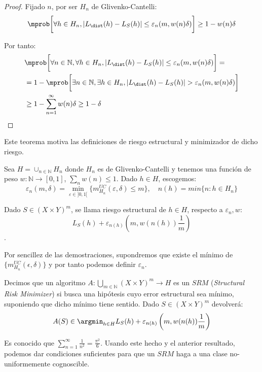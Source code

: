   \begin{proof}
   Fijado $n$, por ser $H_n$ de Glivenko-Cantelli:
   \[
     \mprob\bigg[\forall h\in H_n, |L_{\dist}(h) - L_S(h)| \le \varepsilon_n (m, w(n)\delta)\bigg] \ge 1- w(n) \delta
   \]

   Por tanto:
   \begin{align*}
   &\mprob \bigg[\forall n\in \mathbb{N}, \forall h\in H_n, |L_{\dist}(h) - L_S(h)| \le \varepsilon_n (m, w(n) \delta)\bigg] = \\
   &= 1 - \mprob\bigg[\exists n\in \mathbb{N}, \exists h\in H_n, |L_{\dist}(h) - L_S(h)| > \varepsilon_n (m, w(n) \delta)\bigg] \\
   &\ge 1- \sum_{n=1}^{\infty} w(n) \delta \ge 1-\delta
   \end{align*}
  \end{proof}

Este teorema motiva las definiciones de riesgo estructural y minimizador de dicho riesgo.

\begin{definition}
Sea $H = \cup_{n\in \mathbb{N}} H_n$ donde $H_n$ es de Glivenko-Cantelli y tenemos una función de peso
$w : \mathbb{N} \rightarrow [0,1]$, $\sum_n w(n) \le 1$. Dado $h\in H$, escogemos:
\[
  \varepsilon_n (m,\delta) = \min_{\varepsilon \in ]0,1[}\{m_{H_n}^{UC} (\varepsilon, \delta) \le m\}, \quad n(h) = min\{n: h\in H_n\}
\]

Dado $S\in (X\times Y)^m$, se llama riesgo estructural de $h\in H$, respecto a $\varepsilon_n, w$:
\[L_S(h) + \varepsilon_{n(h)} \left(m, w(n(h))\frac{1}{m}\right)\].
\end{definition}

Por sencillez de las demostraciones, supondremos que existe el mínimo de $\{m_{H_n}^{UC}(\epsilon, \delta)\}$ y por tanto
podemos definir $\varepsilon_n$.

\begin{definition}
Decimos que un algoritmo $A: \underset{m\in \mathbb{N}}{\bigcup} (X\times Y)^m \rightarrow H$ es un $SRM$ 
(\textit{Structural Risk Minimizer}) si busca una hipótesis cuyo error estructural sea mínimo, suponiendo que
dicho mínimo tiene sentido. Dado $S \in (X\times Y)^m$ devolverá:
\[
  A(S) \in \argmin_{h\in H} L_S(h) + \varepsilon_{n(h)} \left(m, w(n(h))\frac{1}{m}\right)
\]
\end{definition}

Es conocido que $\sum_{n=1}^\infty \frac{1}{n^2} = \frac{\pi^2}{6}$. Usando este hecho y el anterior resultado, podemos
dar condiciones suficientes para que un $SRM$ haga a una clase no-uniformemente cognoscible.


